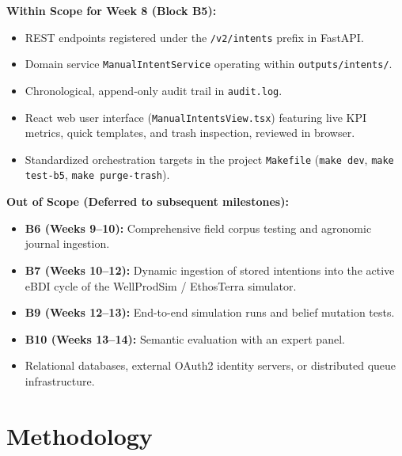 \documentclass[11pt,a4paper]{article}
\begin{document}
\textbf{Within Scope for Week 8 (Block B5):}
\begin{itemize}[itemsep=2pt]
    \item REST endpoints registered under the \texttt{/v2/intents} prefix in FastAPI.
    \item Domain service \texttt{ManualIntentService} operating within \texttt{outputs/intents/}.
    \item Chronological, append-only audit trail in \texttt{audit.log}.
    \item React web user interface (\texttt{ManualIntentsView.tsx}) featuring live KPI metrics, quick templates, and trash inspection, reviewed in browser.
    \item Standardized orchestration targets in the project \texttt{Makefile} (\texttt{make dev}, \texttt{make test-b5}, \texttt{make purge-trash}).
\end{itemize}

\textbf{Out of Scope (Deferred to subsequent milestones):}
\begin{itemize}[itemsep=2pt]
    \item \textbf{B6 (Weeks 9--10):} Comprehensive field corpus testing and agronomic journal ingestion.
    \item \textbf{B7 (Weeks 10--12):} Dynamic ingestion of stored intentions into the active eBDI cycle of the WellProdSim / EthosTerra simulator.
    \item \textbf{B9 (Weeks 12--13):} End-to-end simulation runs and belief mutation tests.
    \item \textbf{B10 (Weeks 13--14):} Semantic evaluation with an expert panel.
    \item Relational databases, external OAuth2 identity servers, or distributed queue infrastructure.
\end{itemize}

\section{Methodology}
\end{document}
